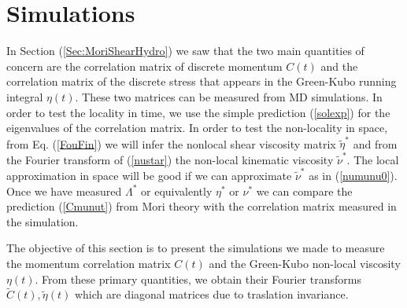 \documentclass[a4paper,openright,12pt]{book}
\begin{document}


\section{Simulations}
\label{Sec:Sim}
In Section (\ref{Sec:MoriShearHydro}) we saw that the  two main  quantities of  concern  are the  correlation matrix  of
discrete momentum  $C(t)$ and the  correlation matrix of  the discrete
stress  that appears  in  the Green-Kubo  running integral  $\eta(t)$.
These two  matrices can be measured  from MD simulations. In  order to
test the locality in time, we use the simple prediction (\ref{solexp})
for the  eigenvalues of the correlation  matrix. In order to  test the
non-locality  in space,  from Eq.   (\ref{FouFin}) we  will infer  the
nonlocal shear viscosity matrix  $\tilde{\eta}^*$ and from the Fourier
transform   of  (\ref{nustar})   the  non-local   kinematic  viscosity
$\tilde{\nu}^*$. The local  approximation in space will be  good if we
can approximate  $\tilde{\nu}^*$ as in (\ref{numunu0}).   Once we have
measured  $\Lambda^*$  or  equivalently  $\eta^*$ or  $\nu^*$  we  can
compare  the  prediction  (\ref{Cmunut})  from Mori  theory  with  the
correlation matrix measured in the simulation.

The objective of this section is to present the simulations we made to measure the
momentum  correlation  matrix  $C(t)$  and  the  Green-Kubo  non-local
viscosity $\eta(t)$.   From these primary quantities,  we obtain their
Fourier transforms  $\tilde{C}(t),\tilde{\eta}(t)$ which  are diagonal
matrices  due to  traslation invariance.  
\end{document}
